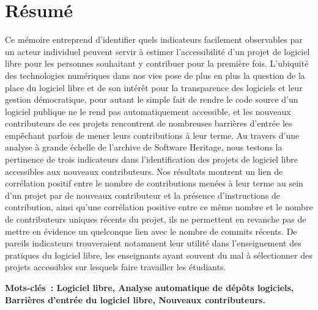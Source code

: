 
\printbibliography[heading=bibintoc, prenote=bibnote]

\printindex

\printglossary

\pagebreak

\section*{Résumé}

Ce mémoire entreprend d'identifier quels indicateurs facilement observables par un acteur individuel peuvent
servir à estimer l'accessibilité d'un projet de logiciel libre pour les personnes souhaitant y contribuer pour
la première fois. L'ubiquité des technologies numériques dans nos vies pose de plus en plus la question de la
place du logiciel libre et de son intérêt pour la transparence des logiciels et leur gestion démocratique,
pour autant le simple fait de rendre le code source d'un logiciel publique ne le rend pas automatiquement
accessible, et les nouveaux contributeurs de ces projets rencontrent de nombreuses barrières d'entrée les
empêchant parfois de mener leurs contributions à leur terme. Au travers d'une analyse à grande échelle de
l'archive de Software Heritage, nous testons la pertinence de trois indicateurs dans l'identification des
projets de logiciel libre accessibles aux nouveaux contributeurs. Nos résultats montrent un lien de
corrélation positif entre le nombre de contributions menées à leur terme au sein d'un projet par de nouveaux
contributeur et la présence d'instructions de contribution, ainsi qu'une corrélation positive entre ce même
nombre et le nombre de contributeurs uniques récents du projet, ils ne permettent en revanche pas de mettre en
évidence un quelconque lien avec le nombre de \glspl{commit} récents. De pareils indicateurs trouveraient
notamment leur utilité dans l'enseignement des pratiques du logiciel libre, les enseignants ayant souvent du
mal à sélectionner des projets accessibles sur lesquels faire travailler les étudiants.

\textbf{%
    Mots-clés : Logiciel libre, Analyse automatique de dépôts logiciels, Barrières d'entrée du logiciel libre,
    Nouveaux contributeurs.
}

